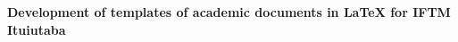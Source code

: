 \begin{center}
\textbf{Development of templates of academic documents in LaTeX for IFTM Ituiutaba\\}
\end{center}